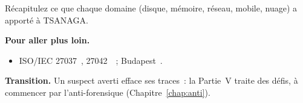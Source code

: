 \begin{boxexo}[title={\ding{45}\quad Exercice~15.10. Bilan domaines \niveauexpert}]
Récapitulez ce que chaque domaine (disque, mémoire, réseau, mobile, nuage) a
apporté à TSANAGA.
\end{boxexo}

\bigskip

\begin{boxinfo}
\textbf{Pour aller plus loin.}
\begin{itemize}
    \item ISO/IEC 27037~\cite{iso27037}, 27042~\cite{iso27042}~;
          Budapest~\cite{budapest2001}.
\end{itemize}
\end{boxinfo}

\begin{boxinfo}
\textbf{Transition.} Un suspect averti efface ses traces~: la Partie~V traite
des défis, à commencer par l'anti-forensique
(Chapitre~\ref{chap:anti}).
\end{boxinfo}
